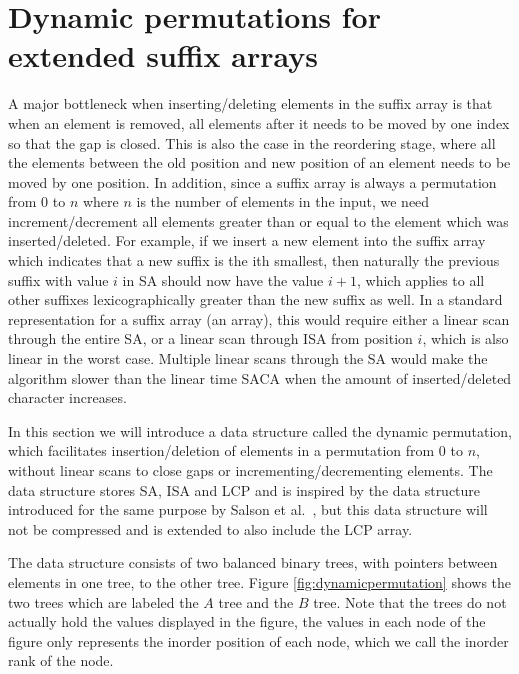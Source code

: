

\section{Dynamic permutations for extended suffix arrays}

A major bottleneck when inserting/deleting elements in the suffix array is that when an
element is removed, all elements after it needs to be moved by one index so that the gap
is closed. This is also the case in the reordering stage, where all the elements between
the old position and new position of an element needs to be moved by one position. In
addition, since a suffix array is always a permutation from $0$ to $n$ where $n$ is the
number of elements in the input, we need increment/decrement all elements greater than or
equal to the element which was inserted/deleted. For example, if we insert a new element
into the suffix array which indicates that a new suffix is the ith smallest, then
naturally the previous suffix with value $i$ in SA should now have the value $i + 1$,
which applies to all other suffixes lexicographically greater than the new suffix as well.
In a standard representation for a suffix array (an array), this would require either a
linear scan through the entire SA, or a linear scan through ISA from position $i$, which
is also linear in the worst case. Multiple linear scans through the SA would make the
algorithm slower than the linear time SACA when the amount of inserted/deleted character
increases. 

In this section we will introduce a data structure called the dynamic permutation, which
facilitates insertion/deletion of elements in a permutation from $0$ to $n$, without
linear scans to close gaps or incrementing/decrementing elements. The data structure
stores SA, ISA and LCP and is inspired by the data structure introduced for the same
purpose by Salson et al.~\cite{DynamicExtendedSuffixArrays}, but this data structure will
not be compressed and is extended to also include the LCP array.

The data structure consists of two balanced binary trees, with pointers between elements
in one tree, to the other tree. Figure \ref{fig:dynamicpermutation} shows the two trees
which are labeled the $A$ tree and the $B$ tree. Note that the trees do not actually hold
the values displayed in the figure, the values in each node of the figure only represents
the inorder position of each node, which we call the inorder rank of the node.

